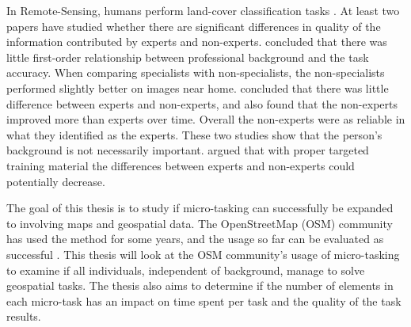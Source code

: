 In Remote-Sensing, humans perform land-cover classification tasks \citep{Salk2016}. At least two papers have studied whether there are significant differences in quality of the information contributed by experts and non-experts.
\cite{Salk2016} concluded that there was little first-order relationship between professional background and the task accuracy.
When comparing specialists with non-specialists, the non-specialists performed slightly better on images near home. 
\cite{See2013} concluded that there was little difference between experts and non-experts, and also found that the non-experts improved more than experts over time. Overall the non-experts were as reliable in what they identified as the experts. These two studies show that the person's background is not necessarily important. \cite{See2013} argued that with proper targeted training material the differences between experts and non-experts could potentially decrease.   

The goal of this thesis is to study if micro-tasking can successfully be expanded to involving maps and geospatial data. The OpenStreetMap (OSM) community has used the method for some years, and the usage so far can be evaluated as successful \citep{Erichsen2016}. This thesis will look at the OSM community's usage of micro-tasking to examine if all individuals, independent of background, manage to solve geospatial tasks. The thesis also aims to determine if the number of elements in each micro-task has an impact on time spent per task and the quality of the task results. 

